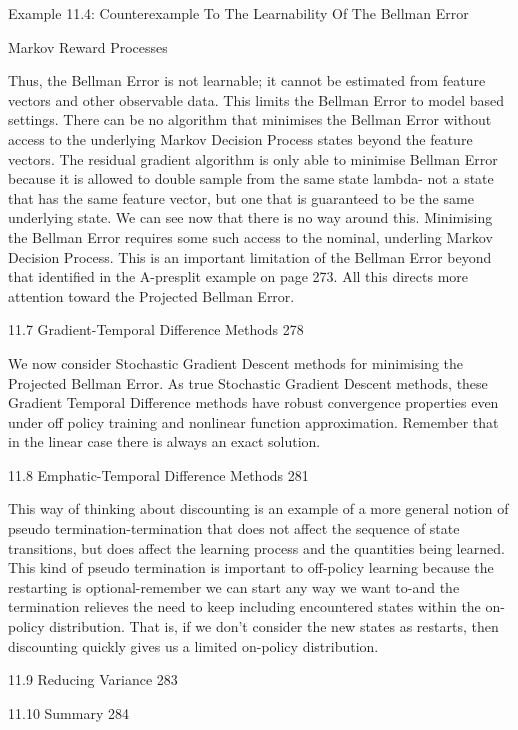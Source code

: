 Example 11.4: Counterexample To The Learnability Of The Bellman Error

Markov Reward Processes

Thus, the Bellman Error is not learnable; it cannot be estimated from feature vectors and other observable data. This limits the Bellman Error to model based settings. There can be no algorithm that minimises the Bellman Error without access to the underlying Markov Decision Process states beyond the feature vectors. The residual gradient algorithm is only able to minimise Bellman Error because it is allowed to double sample from the same state lambda- not a state that has the same feature vector, but one that is guaranteed to be the same underlying state. We can see now that there is no way around this. Minimising the Bellman Error requires some such access to the nominal, underling Markov Decision Process. This is an important limitation of the Bellman Error beyond that identified in the A-presplit example on page 273. All this directs more attention toward the Projected Bellman Error.

11.7 Gradient-Temporal Difference Methods 278

We now consider Stochastic Gradient Descent methods for minimising the Projected Bellman Error. As true Stochastic Gradient Descent methods, these Gradient Temporal Difference methods have robust convergence properties even under off policy training and nonlinear function approximation. Remember that in the linear case there is always an exact solution.

11.8 Emphatic-Temporal Difference Methods 281

This way of thinking about discounting is an example of a more general notion of pseudo termination-termination that does not affect the sequence of state transitions, but does affect the learning process and the quantities being learned. This kind of pseudo termination is important to off-policy learning because the restarting is optional-remember we can start any way we want to-and the termination relieves the need to keep including encountered states within the on-policy distribution. That is, if we don't consider the new states as restarts, then discounting quickly gives us a limited on-policy distribution.

11.9 Reducing Variance 283



11.10 Summary 284

